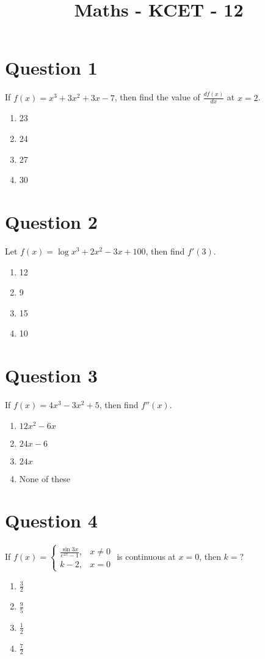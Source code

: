\documentclass{article}
\title{Maths - KCET - 12 }
\begin{document}
                    \maketitle
                    \section*{Question 1}
If \(f(x)=x^{3}+3 x^{2}+3 x-7\), then find the value of \(\frac{d f(x)}{d x}\) at \(x=2\).
\begin{enumerate}[label=(\alph*)]
\item 23
\item 24
\item 27
\item 30
\end{enumerate}
\newpage
\section*{Question 2}
Let \(f(x)=\log x^{3}+2 x^{2}-3 x+100\), then find \(f'(3)\).
\begin{enumerate}[label=(\alph*)]
\item 12
\item 9
\item 15
\item 10
\end{enumerate}
\newpage
\section*{Question 3}
If \(f(x)=4 x^{3}-3 x^{2}+5\), then find \(f''(x)\).
\begin{enumerate}[label=(\alph*)]
\item \(12 x^{2}-6 x\)
\item \(24 x-6\)
\item \(24 x\)
\item None of these
\end{enumerate}
\newpage
\section*{Question 4}
If \(f(x)=\left\{\begin{array}{ll}\frac{\sin 3 x}{e^{2 x}-1}, & x \neq 0 \\ k-2, & x=0\end{array}\right.\) is continuous at \(x=0\), then \(k=\)?
\begin{enumerate}[label=(\alph*)]
\item \(\frac{3}{2}\)
\item \(\frac{9}{5}\)
\item \(\frac{1}{2}\)
\item \(\frac{7}{2}\)
\end{enumerate}
\newpage
\end{document}
